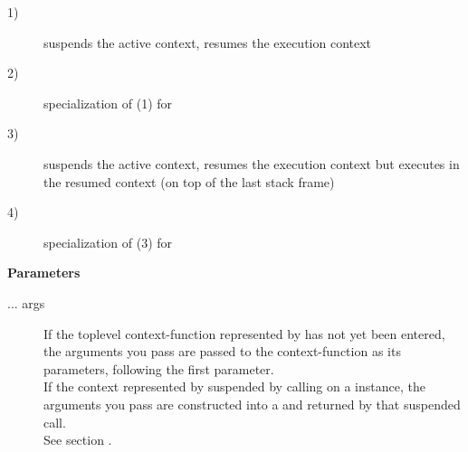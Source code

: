 \begin{description}
    \item[1)] suspends the active context, resumes the execution context
    \item[2)] specialization of (1) for 
    \item[3)] suspends the active context, resumes the execution context but
        executes  in the resumed context (on top of the
        last stack frame)
    \item[4)] specialization of (3) for 
\end{description}

{\bfseries Parameters}
\begin{description}
    \item[... args] If the toplevel context-function represented
                    by  has not yet been entered, the arguments
                    you pass are passed to the context-function as its
                    parameters, following the \ectx first parameter. \\
                    If the context represented by  suspended by
                    calling \op on a \ectx instance, the arguments you pass
                    are constructed into a \ectxargstup and returned by
                    that suspended \op call. \\
                    See section .\\
\end{description}

